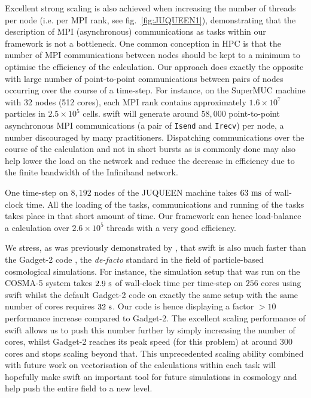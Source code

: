 \documentclass{sig-alternate-05-2015}
\newcommand{\gadget}{{\sc Gadget-2}\xspace}
\newcommand{\swift}{{\sc swift}\xspace}
\begin{document}
Excellent strong scaling is also achieved when increasing the number of threads
per node (i.e. per MPI rank, see fig.~\ref{fig:JUQUEEN1}), demonstrating that
the description of MPI (asynchronous) communications as tasks within our
framework is not a bottleneck. One common conception in HPC is that the number
of MPI communications between nodes should be kept to a minimum to optimise the
efficiency of the calculation. Our approach does exactly the opposite with large
number of point-to-point communications between pairs of nodes occurring over the
course of a time-step. For instance, on the SuperMUC machine with 32 nodes (512
cores), each MPI rank contains approximately $1.6\times10^7$ particles in
$2.5\times10^5$ cells. \swift will generate around $58,000$ point-to-point
asynchronous MPI communications (a pair of \texttt{Isend} and \texttt{Irecv})
per node, a number discouraged by many practitioners. Dispatching communications
over the course of the calculation and not in short bursts as is commonly done
may also help lower the load on the network and reduce the decrease in
efficiency due to the finite bandwidth of the Infiniband network.

One time-step on $8,192$ nodes of the JUQUEEN machine takes $63~\rm{ms}$ of
wall-clock time. All the loading of the tasks, communications and running of the
tasks takes place in that short amount of time. Our framework can hence
load-balance a calculation over $2.6\times10^5$ threads with a very good
efficiency.

We stress, as was previously demonstrated by \cite{ref:Gonnet2015}, that \swift
is also much faster than the \gadget code \cite{Springel2005}, the
\emph{de-facto} standard in the field of particle-based cosmological
simulations. For instance, the simulation setup that was run on the COSMA-5
system takes $2.9~\rm{s}$ of wall-clock time per time-step on $256$ cores using
\swift whilst the default \gadget code on exactly the same setup with the same
number of cores requires $32~\rm{s}$. Our code is hence displaying a factor
$>10$ performance increase compared to \gadget. The excellent scaling
performance of \swift allows us to push this number further by simply increasing
the number of cores, whilst \gadget reaches its peak speed (for this problem) at
around 300 cores and stops scaling beyond that. This unprecedented scaling
ability combined with future work on vectorisation of the calculations within
each task will hopefully make \swift an important tool for future simulations in
cosmology and help push the entire field to a new level.
\end{document}
